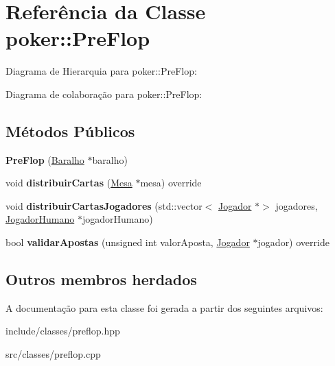 \hypertarget{classpoker_1_1PreFlop}{}\section{Referência da Classe poker\+:\+:Pre\+Flop}
\label{classpoker_1_1PreFlop}


Diagrama de Hierarquia para poker\+:\+:Pre\+Flop\+:


Diagrama de colaboração para poker\+:\+:Pre\+Flop\+:
\subsection*{Métodos Públicos}
\begin{DoxyCompactItemize}
\item 
\mbox{\label{classpoker_1_1PreFlop_a56201e8788885f7e95f5533546bf9f74}} 
{\bfseries Pre\+Flop} (\hyperlink{classpoker_1_1Baralho}{Baralho} $\ast$baralho)
\item 
\mbox{\label{classpoker_1_1PreFlop_a5b6d26eb7f2db3d3304a8354ff178d89}} 
void {\bfseries distribuir\+Cartas} (\hyperlink{classpoker_1_1Mesa}{Mesa} $\ast$mesa) override
\item 
\mbox{\label{classpoker_1_1PreFlop_af15444160a9131ea6e0b520b7d0537e6}} 
void {\bfseries distribuir\+Cartas\+Jogadores} (std\+::vector$<$ \hyperlink{classpoker_1_1Jogador}{Jogador} $\ast$$>$ jogadores, \hyperlink{classpoker_1_1JogadorHumano}{Jogador\+Humano} $\ast$jogador\+Humano)
\item 
\mbox{\label{classpoker_1_1PreFlop_af3ba1e39e9aedeb0c0e5dc6466b1dccc}} 
bool {\bfseries validar\+Apostas} (unsigned int valor\+Aposta, \hyperlink{classpoker_1_1Jogador}{Jogador} $\ast$jogador) override
\end{DoxyCompactItemize}
\subsection*{Outros membros herdados}


A documentação para esta classe foi gerada a partir dos seguintes arquivos\+:\begin{DoxyCompactItemize}
\item 
include/classes/preflop.\+hpp\item 
src/classes/preflop.\+cpp\end{DoxyCompactItemize}
